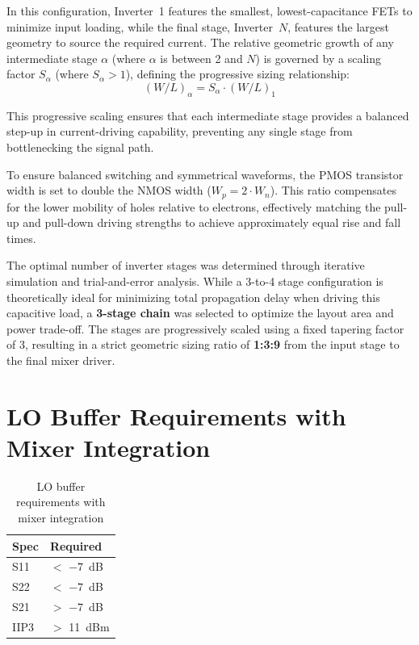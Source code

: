 In this configuration, Inverter~1 features the smallest, lowest-capacitance FETs to minimize input loading, while the final stage, Inverter~$N$, features the largest geometry to source the required current. The relative geometric growth of any intermediate stage $\alpha$ (where $\alpha$ is between 2 and $N$) is governed by a scaling factor $S_\alpha$ (where $S_\alpha > 1$), defining the progressive sizing relationship:
\begin{equation}
(W/L)_\alpha = S_\alpha \cdot (W/L)_1
\end{equation}

This progressive scaling ensures that each intermediate stage provides a balanced step-up in current-driving capability, preventing any single stage from bottlenecking the signal path.

To ensure balanced switching and symmetrical waveforms, the PMOS transistor width is set to double the NMOS width ($W_p = 2 \cdot W_n$). This ratio compensates for the lower mobility of holes relative to electrons, effectively matching the pull-up and pull-down driving strengths to achieve approximately equal rise and fall times.

The optimal number of inverter stages was determined through iterative simulation and trial-and-error analysis. While a 3-to-4 stage configuration is theoretically ideal for minimizing total propagation delay when driving this capacitive load, a \textbf{3-stage chain} was selected to optimize the layout area and power trade-off. The stages are progressively scaled using a fixed tapering factor of 3, resulting in a strict geometric sizing ratio of \textbf{1:3:9} from the input stage to the final mixer driver.

\section{LO Buffer Requirements with Mixer Integration}

\begin{table}[htbp]
    \centering
    \caption{LO buffer requirements with mixer integration}
    \label{tab:lobuffer_specs}
    \begin{tabular}{ll}
        \toprule
        Spec & Required \\
        \midrule
        S11  & $<$ $-7$~dB \\
        S22  & $<$ $-7$~dB \\
        S21  & $>$ $-7$~dB \\
        IIP3 & $>$ 11~dBm \\
        \bottomrule
    \end{tabular}
\end{table}

